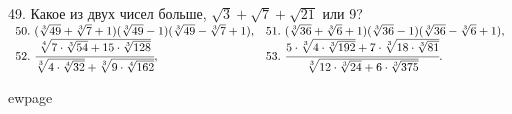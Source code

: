 49. Какое из двух чисел больше, $\sqrt{3}+\sqrt{7}+\sqrt{21}$ или 9?\\
$\begin{array}{ll}
50.\ (\sqrt[3]{49}+\sqrt[3]{7}+1)(\sqrt[3]{49}-1)(\sqrt[3]{49}-\sqrt[3]{7}+1),&
51.\ (\sqrt[3]{36}+\sqrt[3]{6}+1)(\sqrt[3]{36}-1)(\sqrt[3]{36}-\sqrt[3]{6}+1),\\
52.\ \cfrac{\sqrt[4]{7\cdot\sqrt[3]{54}+15\cdot\sqrt[3]{128}}}{\sqrt[3]{4\cdot\sqrt[4]{32}}+\sqrt[3]{9\cdot\sqrt[4]{162}}},&
53.\ \cfrac{5\cdot\sqrt[3]{4\cdot\sqrt[3]{192}}+7\cdot\sqrt[3]{18\cdot\sqrt[3]{81}}}{\sqrt[3]{12\cdot
\sqrt[3]{24}+6\cdot\sqrt[3]{375}}}.
\end{array}$

ewpage
